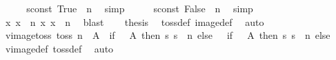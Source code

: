 \begin{isabellebody}
%
\isadelimproof
%
\endisadelimproof
%
\isatagproof
{}\isamarkupfalse%
\ {\isacharminus}{\kern0pt}\isanewline
\ \ \isamarkupfalse%
\ {\isachardoublequoteopen}sconst\ True\ {\isacharbang}{\kern0pt}{\isacharbang}{\kern0pt}\ n{\isachardoublequoteclose}\ \isamarkupfalse%
\ simp\isanewline
\ \ \isamarkupfalse%
\ \isamarkupfalse%
\ {\isachardoublequoteopen}{\isasymnot}sconst\ False\ {\isacharbang}{\kern0pt}{\isacharbang}{\kern0pt}\ n{\isachardoublequoteclose}\ \isamarkupfalse%
\ simp\isanewline
\ \ \isamarkupfalse%
\ \isamarkupfalse%
\ {\isachardoublequoteopen}{\isasymexists}x{\isachardot}{\kern0pt}\ x\ {\isacharbang}{\kern0pt}{\isacharbang}{\kern0pt}\ n{\isachardoublequoteclose}\ {\isachardoublequoteopen}{\isasymexists}x{\isachardot}{\kern0pt}\ {\isasymnot}x\ {\isacharbang}{\kern0pt}{\isacharbang}{\kern0pt}\ n{\isachardoublequoteclose}\ \isamarkupfalse%
\ blast{\isacharplus}{\kern0pt}\isanewline
\ \ \isamarkupfalse%
\ {\isacharquery}{\kern0pt}thesis\ \isamarkupfalse%
\ toss{\isacharunderscore}{\kern0pt}def\ image{\isacharunderscore}{\kern0pt}def\ \isamarkupfalse%
\ auto\isanewline
{}\isamarkupfalse%
%
\endisatagproof
{\isafoldproof}%
%
\isadelimproof
\isanewline
%
\endisadelimproof
\isanewline
{}\isamarkupfalse%
\ vimage{\isacharunderscore}{\kern0pt}toss{\isacharcolon}{\kern0pt}\ {\isachardoublequoteopen}toss\ n\ {\isacharminus}{\kern0pt}{\isacharbackquote}{\kern0pt}\ A\ {\isacharequal}{\kern0pt}\ {\isacharparenleft}{\kern0pt}if\ {}\ {\isasymin}\ A\ then\ {\isacharbraceleft}{\kern0pt}s{\isachardot}{\kern0pt}\ s\ {\isacharbang}{\kern0pt}{\isacharbang}{\kern0pt}\ n{\isacharbraceright}{\kern0pt}\ else\ {\isacharbraceleft}{\kern0pt}{\isacharbraceright}{\kern0pt}{\isacharparenright}{\kern0pt}\ {\isasymunion}\ {\isacharparenleft}{\kern0pt}if\ {\isacharminus}{\kern0pt}{}\ {\isasymin}\ A\ then\ {\isacharbraceleft}{\kern0pt}s{\isachardot}{\kern0pt}\ {\isasymnot}s\ {\isacharbang}{\kern0pt}{\isacharbang}{\kern0pt}\ n{\isacharbraceright}{\kern0pt}\ else\ {\isacharbraceleft}{\kern0pt}{\isacharbraceright}{\kern0pt}{\isacharparenright}{\kern0pt}{\isachardoublequoteclose}\isanewline
%
\isadelimproof
\ \ %
\endisadelimproof
%
\isatagproof
{}\isamarkupfalse%
\ vimage{\isacharunderscore}{\kern0pt}def\ toss{\isacharunderscore}{\kern0pt}def\ \isamarkupfalse%
\ auto%
\endisatagproof
{\isafoldproof}%

\end{isabellebody}
